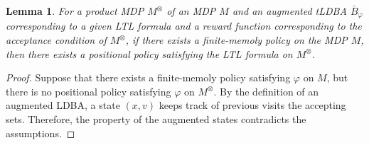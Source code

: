 \documentclass[10 pt, dvipdfmx]{article}
\newtheorem{lemma}{Lemma}
\theoremstyle{definition}
\begin{document}
\begin{lemma}
  For a product MDP $M^{\otimes}$ of an MDP $M$ and an augmented tLDBA $\bar{B}_{\varphi}$ corresponding to a given LTL formula and a reward function corresponding to the acceptance condition of $M^{\otimes}$, if there exists a finite-memoly policy on the MDP $M$, then there exists a positional policy satisfying the LTL formula on $M^{\otimes}$.
\end{lemma}

\begin{proof}
  Suppose that there exists a finite-memoly policy satisfying $\varphi$ on $M$, but there is no positional policy satisfying $\varphi$ on $M^{\otimes}$. By the definition of an augmented LDBA, a state $(x,v)$ keeps track of previous visits the accepting sets. Therefore, the property of the augmented states contradicts the assumptions.
\end{proof}
\end{document}
